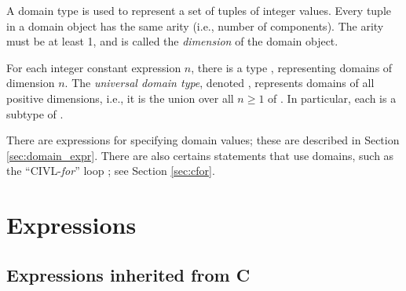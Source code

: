 A domain type is used to represent a set of tuples of integer values.
Every tuple in a domain object has the same arity (i.e., number of
components).  The arity must be at least 1, and is called the
\emph{dimension} of the domain object.

For each integer constant expression $n$, there is a type
, representing domains of dimension $n$.
The \emph{universal domain type}, denoted \cdomain{}, represents
domains of all positive dimensions, i.e., it is the union over all
$n\geq 1$ of .  In particular, each 
is a subtype of \cdomain{}.

There are expressions for specifying domain values; these are
described in Section \ref{sec:domain_expr}.  There are also certains
statements that use domains, such as the ``CIVL-\emph{for}'' loop
\cfor; see Section \ref{sec:cfor}.


\section{Expressions}

\subsection{Expressions inherited from C}

